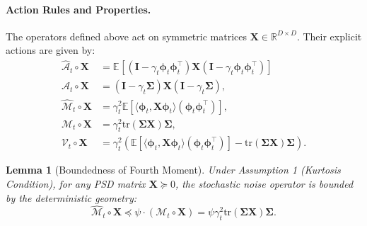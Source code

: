 \documentclass{article}
\theoremstyle{definition}
\theoremstyle{definition}
\theoremstyle{plain}
\theoremstyle{plain}
\theoremstyle{plain}
\newtheorem{lemma}{Lemma}
\theoremstyle{plain}
\theoremstyle{plain}
\newcommand{\bs}[1]{\boldsymbol{\mathbf{#1}}}
\newcommand{\Ex}{\mathbb{E}}
\newcommand{\tr}{\mathrm{tr}}
\newcommand{\id}{\mathbf{I}}
\newcommand{\ex}[2][]{\mathbb{E}_{#1}\left[ #2 \right]}
\begin{document}
\paragraph{Action Rules and Properties.}
The operators defined above act on symmetric matrices $\bs X \in \mathbb{R}^{D \times D}$. Their explicit actions are given by:
\begin{align}
    \widehat{\mathcal{A}}_t \circ \bs X &= \ex{(\id - \gamma_t\bs\phi_t\bs\phi_t^\top)\bs X(\id - \gamma_t\bs\phi_t\bs\phi_t^\top)} \\
    \mathcal{A}_t \circ \bs X &= (\bs I - \gamma_t \bs \Sigma) \bs X (\bs I - \gamma_t \bs \Sigma), \label{eq:action_At} \\
    \widehat{\mathcal{M}}_t \circ \bs X &= \gamma_t^2 \Ex[\langle \bs \phi_t, \bs X \bs \phi_t \rangle (\bs \phi_t \bs \phi_t^\top)], \label{eq:action_hatMt} \\
    \mathcal{M}_t \circ \bs X &= \gamma_t^2 \tr(\bs \Sigma \bs X) \bs \Sigma, \label{eq:action_Mt} \\
    \mathcal{V}_t \circ \bs X &= \gamma_t^2 \left( \mathbb{E}[\langle \bs \phi_t, \bs X \bs \phi_t \rangle (\bs \phi_t \bs \phi_t^\top)] - \tr(\bs \Sigma \bs X) \bs \Sigma \right).
\end{align}



\begin{lemma}[Boundedness of Fourth Moment]
\label{lem:fourthmomentbound}
    Under Assumption 1 (Kurtosis Condition), for any PSD matrix $\bs X \succeq 0$, the stochastic noise operator is bounded by the deterministic geometry:
    \begin{equation}
        \widehat{\mathcal{M}}_t \circ \bs X \preceq \psi \cdot (\mathcal{M}_t \circ \bs X) = \psi \gamma_t^2 \tr(\bs \Sigma \bs X) \bs \Sigma.
    \end{equation}
\end{lemma}
\end{document}
